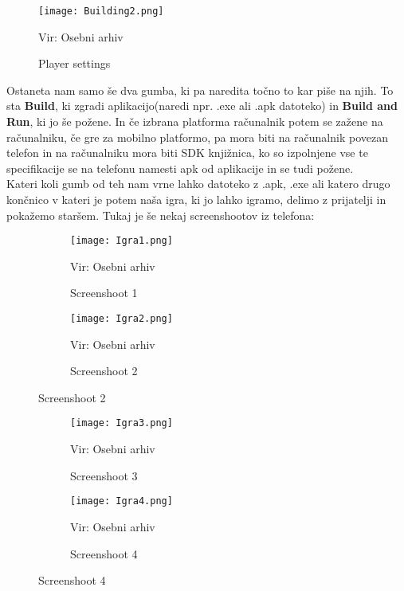 \begin{figure}[ht!]
	\centering
	\texttt{[image: Building2.png]}
	\caption{Player settings}
	{\tiny Vir: Osebni arhiv}
\end{figure}
Ostaneta nam samo še dva gumba, ki pa naredita točno to kar piše na njih. To sta \textbf{Build}, ki zgradi aplikacijo(naredi npr. .exe ali .apk datoteko) in \textbf{Build and Run}, ki jo še požene. In če izbrana platforma računalnik potem se zažene na računalniku, če gre za mobilno platformo, pa mora biti na računalnik povezan telefon in na računalniku mora biti SDK knjižnica, ko so izpolnjene vse te specifikacije se na telefonu namesti apk od aplikacije in se tudi požene.\\
Kateri koli gumb od teh nam vrne lahko datoteko z .apk, .exe ali katero drugo končnico v kateri je potem naša igra, ki jo lahko igramo, delimo z prijatelji in pokažemo staršem. Tukaj je še nekaj screenshootov iz telefona:\\
\begin{figure}[ht!]
	\centering
	\begin{subfigure}{.4\textwidth}
		\texttt{[image: Igra1.png]}
		\caption{Screenshoot 1}
		{\tiny Vir: Osebni arhiv}
		\end{subfigure}
	\begin{subfigure}{.4\textwidth}
		\texttt{[image: Igra2.png]}
		\caption{Screenshoot 2}
		{\tiny Vir: Osebni arhiv}
	\end{subfigure}
\end{figure}
\begin{figure}[ht!]
	\begin{subfigure}{.5\textwidth}
		\texttt{[image: Igra3.png]}
		\caption{Screenshoot 3}
		{\tiny Vir: Osebni arhiv}
	\end{subfigure}
		\begin{subfigure}{.5\textwidth}
		\texttt{[image: Igra4.png]}
		\caption{Screenshoot 4}
		{\tiny Vir: Osebni arhiv}
	\end{subfigure}
\end{figure}